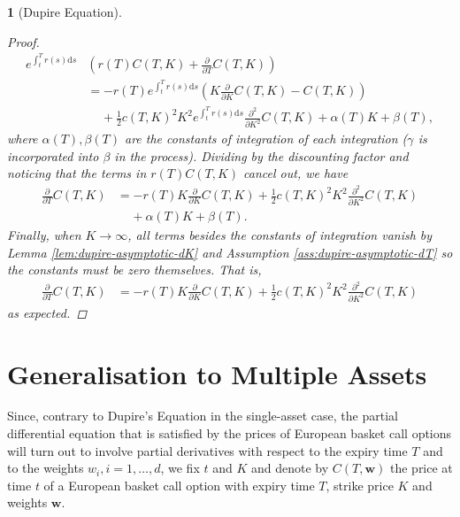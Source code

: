 \documentclass[english]{article}
\numberwithin{equation}{section}
\numberwithin{figure}{section}
\theoremstyle{bolddescit}
\newtheorem{theorem}{\protect\theoremname}[section]
\theoremstyle{definition}
\theoremstyle{definition}
\theoremstyle{plain}
\theoremstyle{plain}
\theoremstyle{bolddesc}
\theoremstyle{plain}
\theoremstyle{remark}
\providecommand{\theoremname}{Theorem}
\begin{document}
\begin{theorem}[Dupire Equation]
\begin{proof}
    \begin{align*}
      e^{\int_t^T r(s) \mathrm{d}s} &\left(r(T) C(T,K) + \frac{\partial}{\partial T}C(T,K)\right)\\
      &= - r(T) e^{\int_t^T r(s) \mathrm{d}s} \left( K \frac{\partial}{\partial K} C(T,K) - C(T,K) \right)\\
        &\ \ \ \ \ + \frac{1}{2} c(T,K)^2 K^2 e^{\int_t^T r(s) \mathrm{d}s}\frac{\partial^2}{\partial K^2} C(T,K) + \alpha(T) K + \beta(T),
    \end{align*}
    where $\alpha(T), \beta(T)$ are the constants of integration of each integration ($\gamma$ is incorporated into $\beta$ in the process). Dividing by the discounting factor and noticing that the terms in $r(T)C(T,K)$ cancel out, we have
    \begin{align*}
      \frac{\partial}{\partial T}C(T,K)
      &= - r(T) K \frac{\partial}{\partial K} C(T,K)
        + \frac{1}{2} c(T,K)^2 K^2 \frac{\partial^2}{\partial K^2} C(T,K)\\
        &\ \ \ \ \ + \alpha(T) K + \beta(T).
    \end{align*}
    Finally, when $K \to \infty$, all terms besides the constants of integration vanish by Lemma \ref{lem:dupire-asymptotic-dK} and Assumption \ref{ass:dupire-asymptotic-dT} so the constants must be zero themselves. That is,
    \begin{align*}
      \frac{\partial}{\partial T}C(T,K)
      &= - r(T) K \frac{\partial}{\partial K} C(T,K)
        + \frac{1}{2} c(T,K)^2 K^2 \frac{\partial^2}{\partial K^2} C(T,K)
    \end{align*}
    as expected.
  \end{proof}
\end{theorem}

\section{Generalisation to Multiple Assets}



Since, contrary to Dupire's Equation in the single-asset case, the partial differential equation that is satisfied by the prices of European basket call options will turn out to involve partial derivatives with respect to the expiry time $T$ and to the weights $w_i, i=1,\ldots,d$, we fix $t$ and $K$ and denote by $C(T,\mathbf{w})$ the price at time $t$ of a European basket call option with expiry time $T$, strike price $K$ and weights $\mathbf{w}$.
\end{document}
